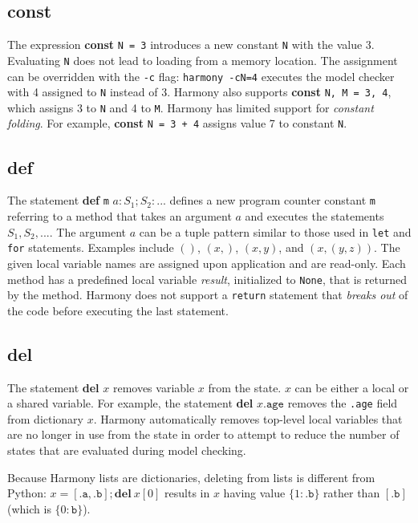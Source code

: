 \documentclass{report}
\begin{document}
\subsection*{\textbf{const}}

The expression \textbf{const} \texttt{N = 3} introduces a new constant
\texttt{N} with the value 3.  Evaluating \texttt{N} does not lead to
loading from a memory location.  The assignment can be overridden with
the \texttt{-c} flag: \texttt{harmony -cN=4} executes the model checker
with 4 assigned to \texttt{N} instead of 3.
Harmony also supports \textbf{const} \texttt{N, M = 3, 4}, which
assigns 3 to \texttt{N} and 4 to \texttt{M}.
Harmony has limited support for \emph{constant folding}.  For example,
\textbf{const} \texttt{N = 3 + 4} assigns value 7 to constant \texttt{N}.

\subsection*{\textbf{def}}

The statement \textbf{def} \texttt{m} $a: S_1; S_2: ...$
defines a new program counter constant \texttt{m} referring to
a method that takes an argument $a$ and executes the statements
$S_1, S_2, ...$.  The argument $a$ can be a tuple pattern similar
to those used in \texttt{let} and \texttt{for} statements.
Examples include $()$, $(x,)$, $(x, y)$, and $(x, (y, z))$.
The given local variable names are assigned upon application and
are read-only.
Each method has a predefined local variable
\textit{result}, initialized to \texttt{None},
that is returned by the method.  Harmony does
not support a \texttt{return} statement that \emph{breaks out}
of the code before executing the last statement.

\subsection*{\textbf{del}}

The statement \textbf{del} $x$ removes variable $x$ from the
state.  $x$ can be either a local or a shared variable.  For
example, the statement \textbf{del} $x.\texttt{age}$ removes
the \texttt{.age} field from dictionary $x$.
Harmony automatically removes top-level local variables that
are no longer in use
from the state in order to attempt to reduce the number of states
that are evaluated during model checking.

Because Harmony lists are dictionaries, deleting from lists is different
from Python:
$x = [\mathtt{.a}, \mathtt{.b}]; \mathbf{del}~x[0]$ results in $x$ having value
$\{1: \mathtt{.b}\}$ rather than $[\mathtt{.b}]$ (which is $\{0: \mathtt{b}\}$).
\end{document}
